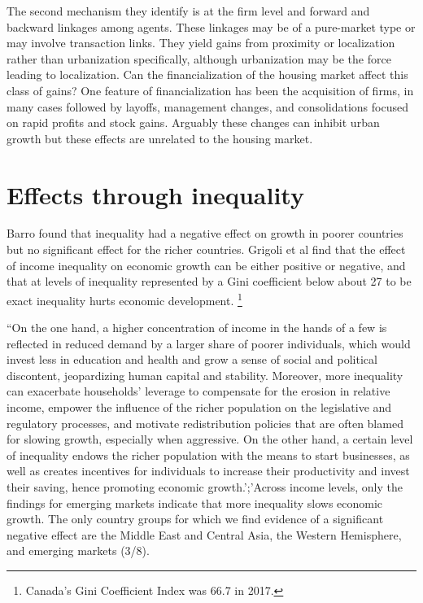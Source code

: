  The second mechanism they identify is at the firm level and forward and backward linkages among agents. These linkages may be of a pure-market type or may involve transaction links. They yield  gains from proximity or localization rather than urbanization specifically, although urbanization may be the force leading to localization. Can the financialization of the housing market affect this class of  gains? One feature of financialization has been the acquisition of firms, in many cases followed by layoffs, management changes, and consolidations focused on rapid profits and stock gains. Arguably these changes can inhibit urban growth but these effects are unrelated to the housing market.
 

\section{Effects through inequality}
Barro \cite{barroInequalityGrowthInvestment1999} found that inequality had a negative effect on growth in poorer countries but no significant effect for the richer countries. Grigoli et al \cite{grigoliInequalityGrowthHeterogeneous2016} find  that the effect of income inequality on economic growth can be either positive or negative, and that at levels  of inequality  represented by a Gini coefficient below about 27  to be exact inequality hurts economic development. \footnote{Canada's Gini Coefficient Index was 66.7 in 2017. } %

 ``On the one hand, a higher concentration of income in the hands of a few is reflected in reduced demand by a larger share of poorer individuals, which would invest less in education and health and grow a sense of social and political discontent, jeopardizing human capital and stability. Moreover, more inequality can exacerbate households’ leverage to compensate for the erosion in relative income, empower the influence of the richer population on the legislative and regulatory processes, and motivate redistribution policies that are often blamed for slowing growth, especially when aggressive. On the other hand, a certain level of inequality endows the richer population with the means to start businesses, as well as creates incentives for individuals to increase their productivity and invest their saving, hence promoting economic growth.';'Across income levels, only the findings for emerging markets indicate that more inequality slows economic growth. The only country groups for which we find evidence of a significant negative effect are the Middle East and Central Asia, the Western Hemisphere, and emerging markets (3/8).

